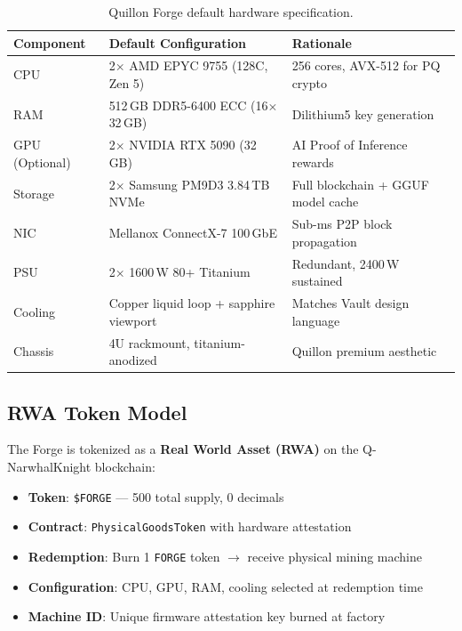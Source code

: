 \documentclass[11pt,a4paper]{article}
\begin{document}
\begin{table}[H]
\centering
\begin{tabular}{@{}lll@{}}
\toprule
\textbf{Component} & \textbf{Default Configuration} & \textbf{Rationale} \\
\midrule
CPU & 2$\times$ AMD EPYC 9755 (128C, Zen 5) & 256 cores, AVX-512 for PQ crypto \\
RAM & 512\,GB DDR5-6400 ECC (16$\times$32\,GB) & Dilithium5 key generation \\
GPU (Optional) & 2$\times$ NVIDIA RTX 5090 (32\,GB) & AI Proof of Inference rewards \\
Storage & 2$\times$ Samsung PM9D3 3.84\,TB NVMe & Full blockchain + GGUF model cache \\
NIC & Mellanox ConnectX-7 100\,GbE & Sub-ms P2P block propagation \\
PSU & 2$\times$ 1600\,W 80+ Titanium & Redundant, 2400\,W sustained \\
Cooling & Copper liquid loop + sapphire viewport & Matches Vault design language \\
Chassis & 4U rackmount, titanium-anodized & Quillon premium aesthetic \\
\bottomrule
\end{tabular}
\caption{Quillon Forge default hardware specification.}
\label{tab:specs}
\end{table}

\subsection{RWA Token Model}

The Forge is tokenized as a \textbf{Real World Asset (RWA)} on the Q-NarwhalKnight blockchain:

\begin{itemize}[noitemsep]
    \item \textbf{Token}: \texttt{\$FORGE} --- 500 total supply, 0 decimals
    \item \textbf{Contract}: \texttt{PhysicalGoodsToken} with hardware attestation
    \item \textbf{Redemption}: Burn 1 \texttt{FORGE} token $\rightarrow$ receive physical mining machine
    \item \textbf{Configuration}: CPU, GPU, RAM, cooling selected at redemption time
    \item \textbf{Machine ID}: Unique firmware attestation key burned at factory
\end{itemize}
\end{document}
